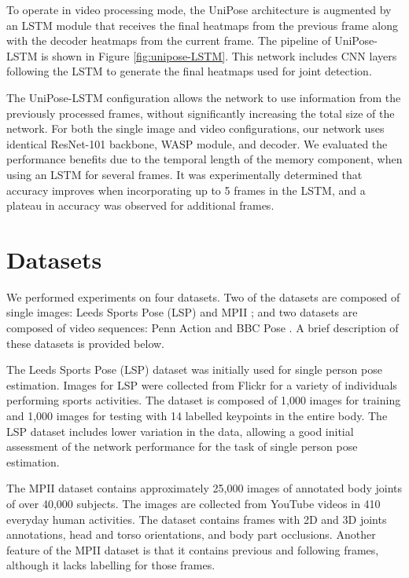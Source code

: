 \documentclass[10pt,twocolumn,letterpaper]{article}
\begin{document}
To operate in video processing mode, the UniPose architecture is augmented by an LSTM module that receives the final heatmaps from the previous frame along with the decoder heatmaps from the current frame. 
The pipeline of UniPose-LSTM is shown in Figure \ref{fig:unipose-LSTM}.
This network includes CNN layers following the LSTM to generate the final heatmaps used for joint detection. 

The UniPose-LSTM configuration allows the network to use information from the previously processed frames, without significantly increasing the total size of the network. For both the single image and video configurations, our network uses identical ResNet-101 backbone, WASP module, and decoder.
We evaluated the performance benefits due to the temporal length of the memory component, when using an LSTM for several frames.
It was experimentally determined that  accuracy improves when incorporating up to 5 frames in the LSTM, and a plateau in accuracy was observed for additional frames.


\section{Datasets}
We performed experiments on four datasets. Two of the datasets are composed of single images: Leeds Sports Pose (LSP) \cite{LSP} and MPII \cite{MPII}; and two datasets are composed of video sequences: Penn Action \cite{PennAction} and BBC Pose \cite{BBC}. A brief description of these datasets is provided below. 

The Leeds Sports Pose (LSP) dataset \cite{LSP} was initially used for single person pose estimation. Images for LSP were collected from Flickr for a variety of individuals performing sports activities. The dataset is composed of 1,000 images for training and 1,000 images for testing with 14 labelled keypoints in the entire body. The LSP dataset includes lower variation in the data, allowing a good initial assessment of the network performance for the task of single person pose estimation.

The MPII \cite{MPII} dataset contains approximately 25,000 images of annotated body joints of over 40,000 subjects. The images are collected from YouTube videos in 410 everyday human activities. The dataset contains frames with 2D and 3D joints annotations, head and torso orientations, and body part occlusions. Another feature of the MPII dataset is that it contains previous and following frames, although it lacks labelling for those frames.
\end{document}
